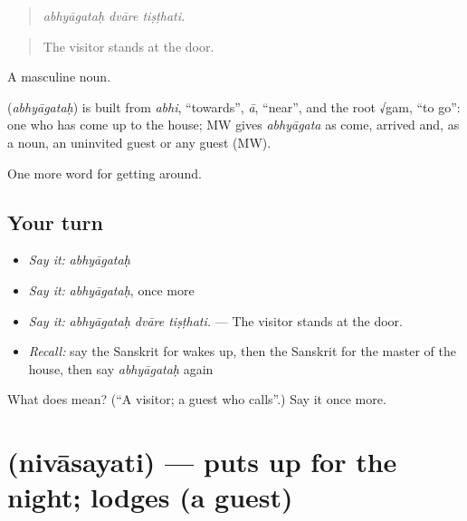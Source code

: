 \begin{quote}
  
\end{quote}

\begin{quote}
\emph{abhyāgataḥ dvāre tiṣṭhati.}
\end{quote}

\begin{quote}
The visitor stands at the door.
\end{quote}

A masculine noun.

\begin{cousinweb}
\textbf{} (\emph{abhyāgataḥ}) is built from \emph{abhi}, \textquotedblleft{}towards\textquotedblright{}, \emph{ā}, \textquotedblleft{}near\textquotedblright{}, and the root √gam, \textquotedblleft{}to go\textquotedblright{}: one who has come up to the house; MW gives \emph{abhyāgata} as come, arrived and, as a noun, an uninvited guest or any guest (MW).
\end{cousinweb}

\begin{grammarlens}[title={What you've built}]
One more word for getting around.
\end{grammarlens}

\subsection*{Your turn}
\begin{itemize}
\raggedright
  \item \emph{Say it:} \emph{abhyāgataḥ}
  \item \emph{Say it:} \emph{abhyāgataḥ}, once more
  \item \emph{Say it:} \emph{abhyāgataḥ dvāre tiṣṭhati.} — The visitor stands at the door.
  \item \emph{Recall:} say the Sanskrit for wakes up, then the Sanskrit for the master of the house, then say \emph{abhyāgataḥ} again
\end{itemize}

\begin{tcolorbox}[breakable,colback=teal!4,colframe=teal!35!black,title={Before you move on}]
What does  mean? (\textquotedblleft{}A visitor; a guest who calls\textquotedblright{}.) Say it once more.
\end{tcolorbox}
\section[\texorpdfstring{\sk{निवासयति} (nivāsayati)}{निवासयति (nivāsayati)}]{ (nivāsayati) — puts up for the night; lodges (a guest)}

